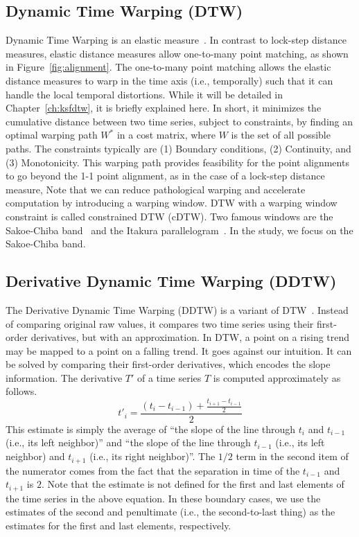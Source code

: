 \subsection{Dynamic Time Warping (DTW)} %

Dynamic Time Warping is an elastic measure~\cite{sakoe1978dynamic}.
In contrast to lock-step distance measures, elastic distance measures allow one-to-many point matching, as shown in Figure~\ref{fig:alignment}.
The one-to-many point matching allows the elastic distance measures to warp in the time axis (i.e., temporally) such that it can handle the local temporal distortions.
While it will be detailed in Chapter~\ref{ch:ksfdtw}, it is briefly explained here.
In short, it minimizes the cumulative distance between two time series, subject to constraints, by finding an optimal warping path $W^*$ in a cost matrix, where $W$ is the set of all possible paths.
The constraints typically are (1) Boundary conditions, (2) Continuity, and (3) Monotonicity.
This warping path provides feasibility for the point alignments to go beyond the 1-1 point alignment, as in the case of a lock-step distance measure,  
Note that we can reduce pathological warping and accelerate computation by introducing a warping window. 
DTW with a warping window constraint is called constrained DTW (cDTW).
Two famous windows are the Sakoe-Chiba band~\cite{sakoe1978dynamic} and the Itakura parallelogram~\cite{itakura1975minimum}.
In the study, we focus on the Sakoe-Chiba band.

\subsection{Derivative Dynamic Time Warping (DDTW)} %

The Derivative Dynamic Time Warping (DDTW) is a variant of DTW~\cite{keogh2001derivative}.
Instead of comparing original raw values, it compares two time series using their first-order derivatives, but with an approximation.
In DTW, a point on a rising trend may be mapped to a point on a falling trend. 
It goes against our intuition.
It can be solved by comparing their first-order derivatives, which encodes the slope information.
The derivative $T'$ of a time series $T$ is computed approximately as follows.
\begin{equation} 
    t'_i = \frac{(t_i-t_{i-1})+\frac{t_{i+1}-t_{i-1}}{2}}{2}
\end{equation}
This estimate is simply the average of ``the slope of the line through $t_i$ and $t_{i-1}$ (i.e., its left neighbor)'' and ``the slope of the line through $t_{i-1}$ (i.e., its left neighbor) and $t_{i+1}$ (i.e., its right neighbor)''.
The $1/2$ term in the second item of the numerator comes from the fact that the separation in time of the $t_{i-1}$ and $t_{i+1}$ is $2$.
Note that the estimate is not defined for the first and last elements of the time series in the above equation. 
In these boundary cases, we use the estimates of the second and penultimate (i.e., the second-to-last thing) as the estimates for the first and last elements, respectively.

